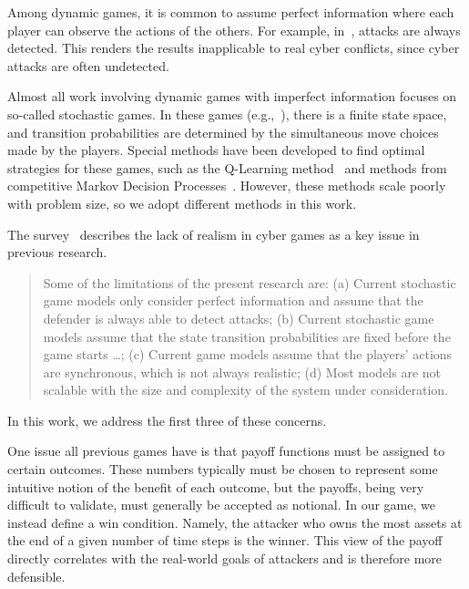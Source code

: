 \documentclass{sig-alternate-05-2015}
\begin{document}

Among dynamic games, it is common to assume perfect information where
each player can observe the actions of the others. For example,
in~\cite{luo2010game, nguyen2009security, patcha2004game, 
  sagduyu2011jamming, shamma2005dynamic}, attacks are always
detected. This renders the results inapplicable to real cyber
conflicts, since cyber attacks are often undetected.


Almost all work involving dynamic games with imperfect information
focuses on so-called stochastic games. In these games
(e.g.,~\cite{alpcan2006intrusion, lye2005game, nguyen2009stochastic,
  sallhammar2006stochastic, xiaolin2008markov}), there is a finite
state space, and transition probabilities are determined by the
simultaneous move choices made by the players. Special methods have
been developed to find optimal strategies for these games, such as the
Q-Learning method~\cite{hu2003nash} and methods from competitive
Markov Decision Processes~\cite{filar2012competitive}. However, these
methods scale poorly with problem size, so we adopt different methods
in this work.

The survey~\cite{roy2010survey} describes the lack of realism in cyber
games as a key issue in previous research.
\begin{quote}
  Some of the limitations of the present research are: (a) Current
  stochastic game models only consider perfect information and
  assume that the defender is always able to detect attacks; (b)
  Current stochastic game models assume that the state transition
  probabilities are fixed before the game starts \ldots; 
  (c) Current game models assume that the players' actions
  are synchronous, which is not always realistic; (d) Most models are
  not scalable with the size and complexity of the system under
  consideration.
\end{quote}
In this work, we address the first three of these concerns.

One issue all previous games have is that payoff functions must be
assigned to certain outcomes. These numbers typically must be chosen
to represent some intuitive notion of the benefit of each outcome, but
the payoffs, being very difficult to validate, must generally be
accepted as notional. In our game, we instead define a win condition. Namely,
the attacker who owns the most assets at the end of a given number of
time steps is the winner. This view of the payoff directly correlates
with the real-world goals of attackers and is therefore more
defensible.
\end{document}
